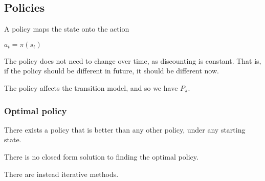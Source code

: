 
\subsection{Policies}

A policy maps the state onto the action

\(a_t=\pi (s_t)\)

The policy does not need to change over time, as discounting is constant. That is, if the policy should be different in future, it should be different now.

The policy affects the transition model, and so we have \(P_\pi \).

\subsubsection{Optimal policy}

There exists a policy that is better than any other policy, under any starting state.

There is no closed form solution to finding the optimal policy.

There are instead iterative methods.

